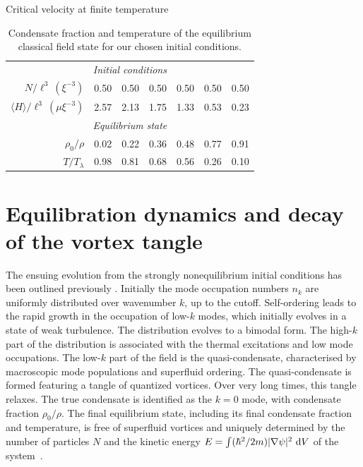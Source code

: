 \begin{chapter}{\label{cha:nonequib}Critical velocity at finite temperature}
\begin{table}
\centering
\begin{tabular}{rcccccc}
\multicolumn{7}{c}{\it Initial conditions} \\  
$N/\ell^3~(\xi^{-3})$           & 0.50 & 0.50 & 0.50 & 0.50 & 0.50 & 0.50 \\
$\langle H \rangle/\ell^3~(\mu \xi^{-3})$  & 2.57 & 2.13 & 1.75 & 1.33 & 0.53 & 0.23 \\ 
\multicolumn{7}{c}{\it Equilibrium state} \\ 
$\rho_0/\rho$        & 0.02 & 0.22 & 0.36 & 0.48 & 0.77 & 0.91 \\
$T/T_\lambda$        & 0.98 & 0.81 & 0.68 & 0.56 & 0.26 & 0.10 
\end{tabular}
\caption{Condensate fraction and temperature of the equilibrium classical field state for our chosen initial conditions.}
\label{tbl:cond_frac}
\end{table}

\section{Equilibration dynamics and decay of the vortex tangle}
\label{sec:tangle}

The ensuing evolution from the strongly nonequilibrium initial conditions has been outlined previously \cite{PhysRevA.66.013603,pattinson_2014}.  Initially the mode occupation numbers $n_k$ are uniformly distributed over wavenumber $k$, up to the cutoff.  Self-ordering leads to the rapid growth in the occupation of low-$k$ modes, which initially evolves in a state of weak turbulence.  The distribution evolves to a bimodal form. The high-$k$ part of the distribution is associated with the thermal excitations and low mode occupations. The low-$k$ part of the field is the quasi-condensate, characterised by macroscopic mode populations and superfluid ordering.  The quasi-condensate is formed featuring a tangle of quantized vortices.  Over very long times, this tangle relaxes.  The true condensate is identified as the $k=0$ mode, with condensate fraction $\rho_0/\rho$. %
The final equilibrium state, including its final condensate fraction and temperature, is free of superfluid vortices and uniquely determined by the number of particles $N$ and the kinetic energy $E=\int (\hbar^2/2m)|\nabla \psi|^2~{\rm d}V$ of the system~\cite{PhysRevLett.95.263901}.  


\end{chapter}

